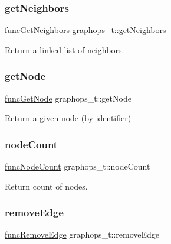 \subsubsection{\texorpdfstring{get\+Neighbors}{getNeighbors}}
{\footnotesize\ttfamily \hyperlink{graphops_8h_aaa1468312d0d9fb546507a624821f412}{func\+Get\+Neighbors} graphops\+\_\+t\+::get\+Neighbors}



Return a linked-\/list of neighbors. 

\mbox{\label{structgraphops__t_ab410442ef123fc79f1c8a431502e2a23}} 
\subsubsection{\texorpdfstring{get\+Node}{getNode}}
{\footnotesize\ttfamily \hyperlink{graphops_8h_acdebce5fd9d56d8a2ebacd396fbd735a}{func\+Get\+Node} graphops\+\_\+t\+::get\+Node}



Return a given node (by identifier) 

\mbox{\label{structgraphops__t_a07801b43de87d48f426d7abf7959e738}} 
\subsubsection{\texorpdfstring{node\+Count}{nodeCount}}
{\footnotesize\ttfamily \hyperlink{graphops_8h_aa7c1a3ee12ef36bca906669c4164ccee}{func\+Node\+Count} graphops\+\_\+t\+::node\+Count}



Return count of nodes. 

\mbox{\label{structgraphops__t_a330cbf9dbf71b84a47ab7ac8a11d71fa}} 
\subsubsection{\texorpdfstring{remove\+Edge}{removeEdge}}
{\footnotesize\ttfamily \hyperlink{graphops_8h_add68b0e594df34b6e201605a3757b78b}{func\+Remove\+Edge} graphops\+\_\+t\+::remove\+Edge}



